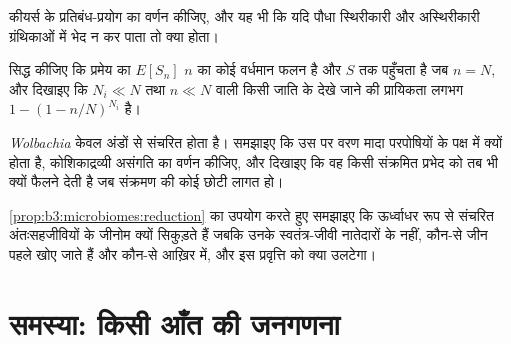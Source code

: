 \begin{exercise}[$\star\star$]\label{exo:b3:microbiomes:9}
कीयर्स के प्रतिबंध-प्रयोग का वर्णन कीजिए, और यह भी कि यदि पौधा
स्थिरीकारी और अस्थिरीकारी ग्रंथिकाओं में भेद न कर पाता तो क्या होता।
\end{exercise}

\begin{exercise}[$\star\star\star$]\label{exo:b3:microbiomes:10}
सिद्ध कीजिए कि  प्रमेय का $E[S_{n}]$ $n$ का कोई वर्धमान फलन है और
$S$ तक पहुँचता है जब $n = N$, और दिखाइए कि $N_{i} \ll N$ तथा
$n \ll N$ वाली किसी जाति के देखे जाने की प्रायिकता लगभग
$1 - (1 - n/N)^{N_{i}}$ है।
\end{exercise}

\begin{exercise}[$\star\star\star$]\label{exo:b3:microbiomes:11}
\emph{Wolbachia} केवल अंडों से संचरित होता है। समझाइए कि उस पर वरण
मादा परपोषियों के पक्ष में क्यों होता है, कोशिकाद्रव्यी असंगति का
वर्णन कीजिए, और दिखाइए कि वह किसी संक्रमित प्रभेद को तब भी क्यों फैलने
देती है जब संक्रमण की कोई छोटी लागत हो।
\end{exercise}

\begin{exercise}[$\star\star\star$]\label{exo:b3:microbiomes:12}
\cref{prop:b3:microbiomes:reduction} का उपयोग करते हुए समझाइए कि
ऊर्ध्वाधर रूप से संचरित अंतःसहजीवियों के जीनोम क्यों सिकुड़ते हैं जबकि
उनके स्वतंत्र-जीवी नातेदारों के नहीं, कौन-से जीन पहले खोए जाते हैं और
कौन-से आख़िर में, और इस प्रवृत्ति को क्या उलटेगा।
\end{exercise}

\section{समस्या: किसी आँत की जनगणना}

